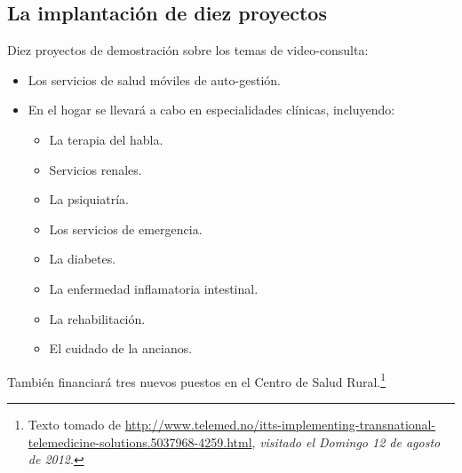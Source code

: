 \documentclass[xcolor=svgnames]{beamer}
\begin{document}
\subsection{La implantación de diez proyectos}
\begin{frame}
   Diez proyectos de demostración sobre los temas de video-consulta:\pause
    \begin{itemize}
     \item Los servicios de salud móviles de auto-gestión.\pause
     \item En el hogar se llevará a cabo en especialidades clínicas, incluyendo: \pause
	\begin{itemize}
	 \item La terapia del habla.\pause
	 \item Servicios renales.\pause
	 \item La psiquiatría.\pause
	 \item Los servicios de emergencia.\pause 
	 \item La diabetes.\pause 
	 \item La enfermedad inflamatoria intestinal.\pause 
	 \item La rehabilitación.\pause
	 \item El cuidado de la ancianos.\\
	\end{itemize}
    \end{itemize} \pause
   También financiará tres nuevos puestos en el Centro de Salud Rural.\footnote{Texto tomado de \url{http://www.telemed.no/itts-implementing-transnational-telemedicine-solutions.5037968-4259.html}, \textit{visitado el Domingo 12 de agosto de 2012}.}
\end{frame}
\end{document}

